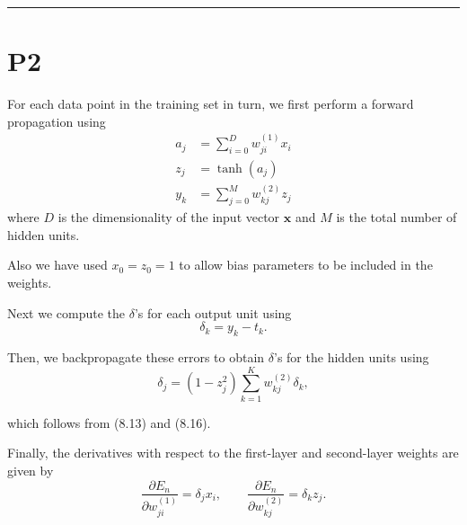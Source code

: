 \documentclass{article}
\begin{document}
\noindent\rule{\linewidth}{0.4pt}

\section{P2}

For each data point in the training set in turn, we first perform a forward propagation using
\begin{align} 
    a_j &= \sum_{i=0}^D w_{ji}^{(1)} x_i \tag{8.18} \\ 
    z_j &= \tanh(a_j) \tag{8.19} \\ 
    y_k &= \sum_{j=0}^M w_{kj}^{(2)} z_j \tag{8.20} 
\end{align}
where $D$ is the dimensionality of the input vector $\mathbf{x}$ and $M$ is the total number of hidden units. 

Also we have used $x_0 = z_0 = 1$ to allow bias parameters to be included in the weights. 

Next we compute the $\delta$'s for each output unit using
\begin{equation}
\delta_k = y_k - t_k. 
\tag{8.21}
\end{equation}

Then, we backpropagate these errors to obtain $\delta$'s for the hidden units using
\begin{equation}
\delta_j = (1 - z_j^2) \sum_{k=1}^K w_{kj}^{(2)} \delta_k, \tag{8.22}
\end{equation}

which follows from (8.13) and (8.16). 

Finally, the derivatives with respect to the first-layer and second-layer weights are given by
\begin{equation}
\frac{\partial E_n}{\partial w_{ji}^{(1)}} = \delta_j x_i, \qquad \frac{\partial E_n}{\partial w_{kj}^{(2)}} = \delta_k z_j. 
\tag{8.23}
\end{equation}
\end{document}
